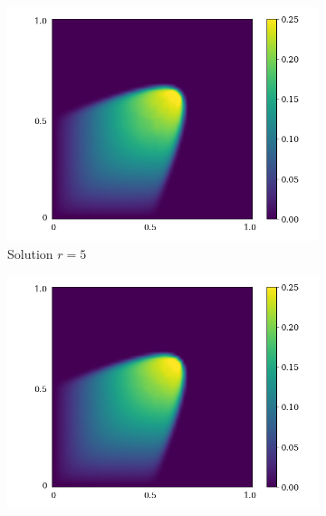 \begin{figure}[ht!]
     \begin{center}
        \begin{subfigure}[b]{0.20\textwidth}
            \begin{center}
                \includegraphics[trim = {0, 0, 3cm, 0}, clip, width=\textwidth]{Pictures/X-rom-LE-SAE-5.png}
            \end{center}
            \caption{Solution $r = 5$}
        \end{subfigure}
   \begin{subfigure}[b]{0.20\textwidth}
        \begin{center}
            \includegraphics[trim = {0, 0, 3cm, 0}, clip, width=\textwidth]{Pictures/X-rom-LE-SAE-10.png}

\end{center}
\end{subfigure}
\end{center}
\end{figure}
